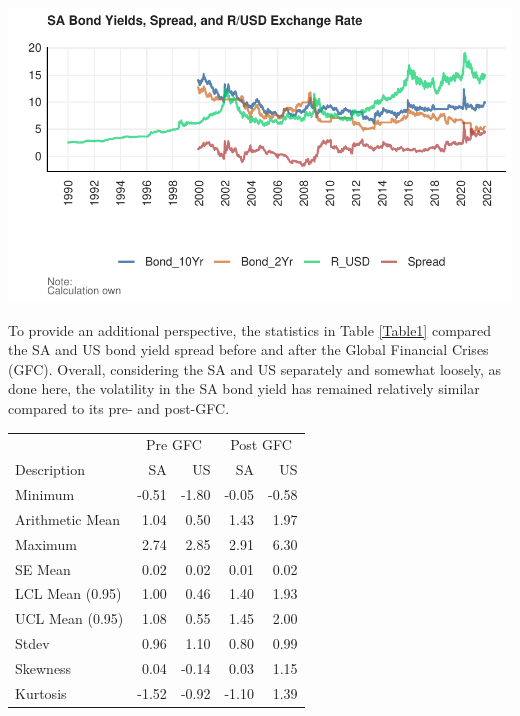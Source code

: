 \documentclass[11pt,preprint, authoryear]{elsarticle}
\let\origfigure\figure
\let\endorigfigure\endfigure
\renewenvironment{figure}[1][2] {
    \expandafter\origfigure\expandafter[H]
} {
    \endorigfigure
}
\let\origtable\table
\let\endorigtable\endtable
\renewenvironment{table}[1][2] {
    \expandafter\origtable\expandafter[H]
} {
    \endorigtable
}
\numberwithin{equation}{section}
\numberwithin{figure}{section}
\numberwithin{table}{section}
\begin{document}
\begin{figure}[H]

{\centering \includegraphics{Question2_files/figure-latex/SA_Bonds_Plot-1} 

}

\caption{SA Bond Yields, Spread, and ZAR/USD Exchange Rate \label{Figure2}}\label{fig:SA_Bonds_Plot}
\end{figure}

To provide an additional perspective, the statistics in Table
\ref{Table1} compared the SA and US bond yield spread before and after
the Global Financial Crises (GFC). Overall, considering the SA and US
separately and somewhat loosely, as done here, the volatility in the SA
bond yield has remained relatively similar compared to its pre- and
post-GFC.

\begin{table}

\caption{\label{tab:stats table}SA vs US Bond Yield Spread Statistics: Pre GFC vs Post GFC. \label{Table1}}
\centering
\begin{tabular}[t]{lrrrr}
\toprule
\multicolumn{1}{c}{ } & \multicolumn{2}{c}{Pre GFC} & \multicolumn{2}{c}{Post GFC} \\
\cmidrule(l{3pt}r{3pt}){2-3} \cmidrule(l{3pt}r{3pt}){4-5}
Description & SA & US & SA & US\\
\midrule
Minimum & -0.51 & -1.80 & -0.05 & -0.58\\
Arithmetic Mean & 1.04 & 0.50 & 1.43 & 1.97\\
Maximum & 2.74 & 2.85 & 2.91 & 6.30\\
SE Mean & 0.02 & 0.02 & 0.01 & 0.02\\
LCL Mean (0.95) & 1.00 & 0.46 & 1.40 & 1.93\\
\addlinespace
UCL Mean (0.95) & 1.08 & 0.55 & 1.45 & 2.00\\
Stdev & 0.96 & 1.10 & 0.80 & 0.99\\
Skewness & 0.04 & -0.14 & 0.03 & 1.15\\
Kurtosis & -1.52 & -0.92 & -1.10 & 1.39\\
\bottomrule
\end{tabular}
\end{table}
\end{document}
